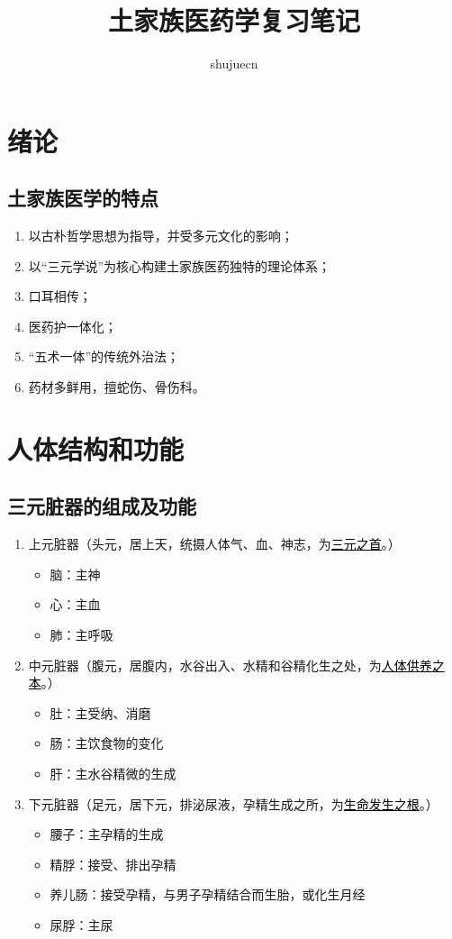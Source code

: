 \documentclass[cn,black,12pt,normal,founder]{elegantnote}
\title{土家族医药学复习笔记}
\author{shujuecn}
\date{\zhtoday}
\newcommand{\redt}[1]{\textcolor{black}{{}#1}}      %
\begin{document}
\maketitle

\section{绪论}

\subsection{土家族医学的特点}

\begin{enumerate}
  \item 以古朴哲学思想为指导，并受多元文化的影响；
  \item 以“三元学说”为核心构建土家族医药独特的理论体系；
  \item 口耳相传；
  \item 医药护一体化；
  \item “五术一体”的传统外治法；
  \item 药材多鲜用，擅蛇伤、骨伤科。
\end{enumerate}

\section{人体结构和功能}

\subsection{三元脏器的组成及功能}

\begin{enumerate}
  \item 上元脏器（头元，居上天，统摄人体气、血、神志，为\redt{\uline{三元之首}}。）
  \begin{itemize}
    \item 脑：主神
    \item 心：主血
    \item 肺：主呼吸
  \end{itemize}
  \item 中元脏器（腹元，居腹内，水谷出入、水精和谷精化生之处，为\redt{\uline{人体供养之本}}。）
  \begin{itemize}
    \item 肚：主受纳、消磨
    \item 肠：主饮食物的变化
    \item 肝：主水谷精微的生成
  \end{itemize}
  \item 下元脏器（足元，居下元，排泌尿液，孕精生成之所，为\redt{\uline{生命发生之根}}。）
  \begin{itemize}
    \item 腰子：主孕精的生成
    \item 精脬：接受、排出孕精
    \item 养儿肠：接受孕精，与男子孕精结合而生胎，或化生月经
    \item 尿脬：主尿
  \end{itemize}
\end{enumerate}
\end{document}
